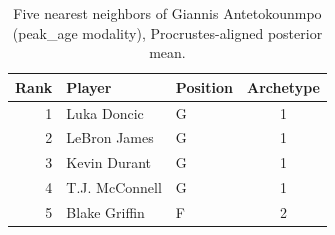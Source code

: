 \begin{table}[htbp]
  \centering\small
  \begin{tabular}{rllc}
    \toprule
    Rank & Player & Position & Archetype \\
    \midrule
    1 & Luka Doncic & G & 1 \\
    2 & LeBron James & G & 1 \\
    3 & Kevin Durant & G & 1 \\
    4 & T.J. McConnell & G & 1 \\
    5 & Blake Griffin & F & 2 \\
    \bottomrule
  \end{tabular}
  \caption{Five nearest neighbors of Giannis Antetokounmpo (peak_age modality), Procrustes-aligned posterior mean.}
  \label{tab:Giannis_Antetokounmpo_neighbors_peak_age}
\end{table}

